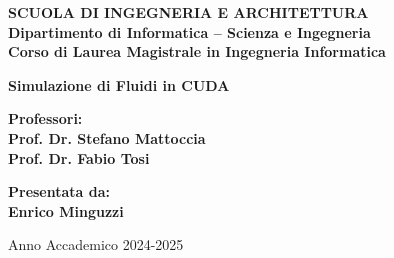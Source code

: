 \begin{titlepage}
\begin{center}
{\small{\bf SCUOLA DI INGEGNERIA E ARCHITETTURA\\
\vspace{2mm}
Dipartimento di Informatica -- Scienza e Ingegneria\\
\vspace{2mm}
Corso di Laurea Magistrale in Ingegneria Informatica }}
\end{center}

\vspace*{\fill}
\begin{center}
{\LARGE{\bf Simulazione di Fluidi in CUDA\\
\vspace{5mm}
}}
\end{center}
\vspace*{\fill}
\par
\noindent
\vfill
\begin{minipage}[t]{0.47\textwidth}
{\normalsize{\bf Professori:\\
Prof. Dr. Stefano Mattoccia \\
Prof. Dr. Fabio Tosi

}}
\end{minipage}
\hfill
\begin{minipage}[t]{0.47\textwidth}\raggedleft
{\normalsize{\bf Presentata da:\\
Enrico Minguzzi}}
\end{minipage}
\vspace{10mm} %
\begin{center}
{\normalsize{%
Anno Accademico 2024-2025}}%
\end{center}
\end{titlepage}
